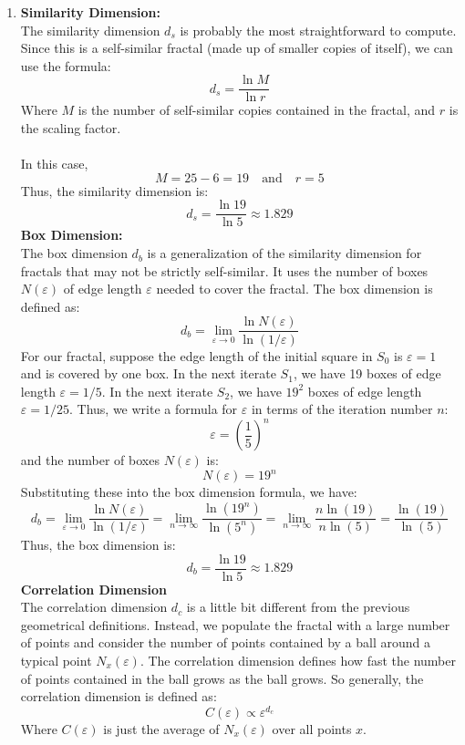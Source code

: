 \documentclass[11pt]{article}
\begin{document}
\begin{enumerate}
\item [(b)] \textbf{Similarity Dimension:}\\
 The similarity dimension $d_s$ is probably the most straightforward to compute. Since this is a self-similar fractal (made up of smaller copies of itself), we can use the formula:
\[d_s = \frac{\ln M}{\ln r}\]
Where $M$ is the number of self-similar copies contained in the fractal, and $r$ is the scaling factor.\\\\
In this case, 
\[M = 25 - 6 = 19 \quad \text{and} \quad r = 5\]
Thus, the similarity dimension is:
\[\boxed{d_s = \frac{\ln 19}{\ln 5} \approx 1.829}\]
\textbf{Box Dimension:}\\
The box dimension $d_b$ is a generalization of the similarity dimension for fractals that may not be strictly self-similar. It uses the number of boxes $N(\varepsilon)$ of edge length $\varepsilon$ needed to cover the fractal. The box dimension is defined as:
\[d_b = \lim_{\varepsilon \to 0} \frac{\ln N(\varepsilon)}{\ln(1/\varepsilon)}\]
For our fractal, suppose the edge length of the initial square in $S_0$ is $\varepsilon=1$ and is covered by one box. In the next iterate $S_1$, we have 19 boxes of edge length $\varepsilon=1/5$. In the next iterate $S_2$, we have $19^2$ boxes of edge length $\varepsilon=1/25$. Thus, we write a formula for $\varepsilon$ in terms of the iteration number $n$:
\[\varepsilon = \left(\frac{1}{5}\right)^n\]
and the number of boxes $N(\varepsilon)$ is:
\[N(\varepsilon) = 19^n\]
Substituting these into the box dimension formula, we have:
\[d_b = \lim_{\varepsilon \to 0} \frac{\ln N(\varepsilon)}{\ln(1/\varepsilon)} = \lim_{n \to \infty} \frac{\ln(19^n)}{\ln(5^n)} = \lim_{n \to \infty} \frac{n\ln(19)}{n\ln(5)} = \frac{\ln(19)}{\ln(5)}\]
Thus, the box dimension is:
\[\boxed{d_b = \frac{\ln 19}{\ln 5} \approx 1.829}\]
\textbf{Correlation Dimension}\\
The correlation dimension $d_c$ is a little bit different from the previous geometrical definitions. Instead, we populate the fractal with a large number of points and consider the number of points contained by a ball around a typical point $N_x(\varepsilon)$. The correlation dimension defines how fast the number of points contained in the ball grows as the ball grows. So generally, the correlation dimension is defined as:
\[C(\varepsilon) \propto \varepsilon^{d_c}\]
Where $C(\varepsilon)$ is just the average of $N_x(\varepsilon)$ over all points $x$.\\\\

\end{enumerate}
\end{document}
